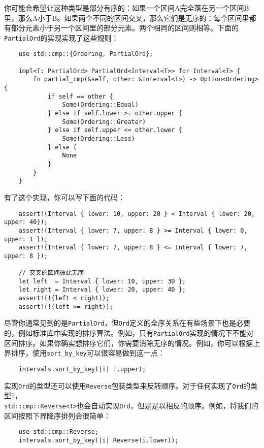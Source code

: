 你可能会希望让这种类型是部分有序的：如果一个区间A完全落在另一个区间B里，那么A小于B。如果两个不同的区间交叉，那么它们是无序的：每个区间里都有部分元素小于另一个区间里的部分元素。两个相同的区间则相等。下面的\texttt{PartialOrd}的实现实现了这些规则：
\begin{verbatim}
    use std::cmp::{Ordering, PartialOrd};

    impl<T: PartialOrd> PartialOrd<Interval<T>> for Interval<T> {
        fn partial_cmp(&self, other: &Interval<T>) -> Option<Ordering> {
            if self == other {
                Some(Ordering::Equal)
            } else if self.lower >= other.upper {
                Some(Ordering::Greater)
            } else if self.upper <= other.lower {
                Some(Ordering::Less)
            } else {
                None
            }
        }
    }
\end{verbatim}

有了这个实现，你可以写下面的代码：
\begin{verbatim}
    assert!(Interval { lower: 10, upper: 20 } < Interval { lower: 20, upper: 40});
    assert!(Interval { lower: 7, upper: 8 } >= Interval { lower: 0, upper: 1 });
    assert!(Interval { lower: 7, upper: 8 } <= Interval { lower: 7, upper: 8 });

    // 交叉的区间彼此无序
    let left  = Interval { lower: 10, upper: 30 };
    let right = Interval { lower: 20, upper: 40 };
    assert!(!(left < right));
    assert!(!(left >= right));
\end{verbatim}

尽管你通常见到的是\texttt{PartialOrd}，但\texttt{Ord}定义的全序关系在有些场景下也是必要的，例如标准库中实现的排序算法。例如，只有\texttt{PartialOrd}实现的情况下不能对区间排序。如果你确实想排序它们，你需要消除无序的情况。例如，你可以根据上界排序，使用\texttt{sort\_by\_key}可以很容易做到这一点：
\begin{verbatim}
    intervals.sort_by_key(|i| i.upper);
\end{verbatim}

实现\texttt{Ord}的类型还可以使用\texttt{Reverse}包装类型来反转顺序。对于任何实现了\texttt{Ord}的类型\texttt{T}，\\
\texttt{std::cmp::Reverse<T>}也会自动实现\texttt{Ord}，但是是以相反的顺序。例如，将我们的区间按照下界降序排列会很简单：
\begin{verbatim}
    use std::cmp::Reverse;
    intervals.sort_by_key(|i| Reverse(i.lower));
\end{verbatim}

